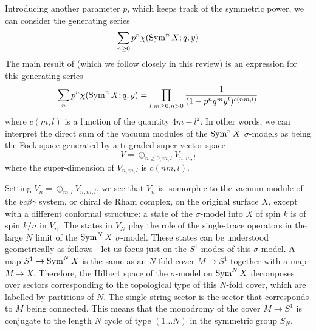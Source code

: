 \documentclass[../main.tex]{subfiles}
\begin{document}
Introducing another parameter $p$, which keeps track of the symmetric power, we can consider the generating series
\begin{equation} 
	\sum_{n \geq 0} p^n \chi(\operatorname{Sym}^n X; q,y) 
\end{equation}
The main result of \cite{deBoerEG, DMVV} (which we follow closely in this review) is an expression for this generating series
\begin{equation} 
	\sum_{n} p^n \chi(\operatorname{Sym}^n X; q,y) = \prod_{l,m \geq 0,n >0 } \frac{1}{(1 - p^n q^m y^l)^{c(nm,l)}}
\end{equation}
where $c(m,l)$ is a function of the quantity $4m-l^2$.
In other words, we can interpret the direct sum of the vacuum modules of the $\operatorname{Sym}^n X$ $\sigma$-models as being the Fock space generated by a trigraded super-vector space 
\begin{equation} 
	V =\oplus_{n \ge 0,m,l} V_{n,m,l} 
\end{equation}
where the super-dimension of $V_{n,m,l}$ is $c(nm,l)$.

Setting $V_n = \oplus_{m,l} V_{n,m,l}$, we see that $V_n$ is isomorphic to the vacuum module of the $bc\beta\gamma$ system, or chiral de Rham complex, on the original surface $X$, except with a different conformal structure: a state of the $\sigma$-model into $X$ of spin $k$ is of spin $k/n$ in $V_n$.  The states in $V_N$ play the role of the single-trace operators in the large $N$ limit of the $\operatorname{Sym}^N X$ $\sigma$-model.   
These states can be understood geometrically as follows---let us focus just on the $S^1$-modes of this $\sigma$-model.
A map $S^1 \to \operatorname{Sym}^N X$ is the same as an $N$-fold cover $M \to S^1$ together with a map $M \to X$.  
Therefore, the Hilbert space of the $\sigma$-model on $\operatorname{Sym}^N X$ decomposes over sectors corresponding to the topological type of this $N$-fold cover, which are labelled by partitions of $N$. 
The single string sector is the sector that corresponds to $M$ being connected. 
This means that the monodromy of the cover $M \to  S^1$ is conjugate to the length $N$ cycle of type $(1 \dots N)$ in the symmetric group $S_N$.  
\end{document}
